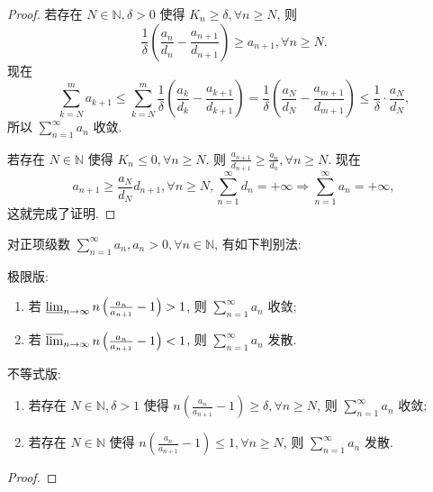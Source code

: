 \documentclass[../../main.tex]{subfiles}
\begin{document}
\begin{proof}
若存在 \( N \in \mathbb{N}, \delta > 0 \) 使得 \( K_n \geqslant \delta, \forall n \geqslant N \), 则
\[
\frac{1}{\delta} \left( \frac{a_n}{d_n} - \frac{a_{n + 1}}{d_{n + 1}} \right) \geqslant a_{n + 1}, \forall n \geqslant N.
\]
现在
\[
\sum_{k=N}^m a_{k + 1} \leqslant \sum_{k=N}^m \frac{1}{\delta} \left( \frac{a_k}{d_k} - \frac{a_{k + 1}}{d_{k + 1}} \right) = \frac{1}{\delta} \left( \frac{a_N}{d_N} - \frac{a_{m + 1}}{d_{m + 1}} \right) \leqslant \frac{1}{\delta} \cdot \frac{a_N}{d_N},
\]
所以 \( \sum_{n=1}^\infty a_n \) 收敛.

若存在 \( N \in \mathbb{N} \) 使得 \( K_n \leqslant 0, \forall n \geqslant N \). 则 \( \frac{a_{n + 1}}{d_{n + 1}} \geqslant \frac{a_n}{d_n}, \forall n \geqslant N \). 现在
\[
a_{n + 1} \geqslant \frac{a_N}{d_N} d_{n + 1}, \forall n \geqslant N, \sum_{n=1}^\infty d_n = +\infty \Rightarrow \sum_{n=1}^\infty a_n = +\infty,
\]
这就完成了证明.

\end{proof}

\begin{theorem}[拉比判别法]\label{theorem:拉比判别法}
对正项级数 \( \sum_{n=1}^\infty a_n, a_n > 0, \forall n \in \mathbb{N} \), 有如下判别法:

极限版:
\begin{enumerate}
\item 若 \( \varliminf_{n \to \infty} n \left( \frac{a_n}{a_{n + 1}} - 1 \right) > 1 \), 则 \( \sum_{n=1}^\infty a_n \) 收敛;
\item 若 \( \varlimsup_{n \to \infty} n \left( \frac{a_n}{a_{n + 1}} - 1 \right) < 1 \), 则 \( \sum_{n=1}^\infty a_n \) 发散.
\end{enumerate}

不等式版:
\begin{enumerate}
\item 若存在 \( N \in \mathbb{N}, \delta > 1 \) 使得 \( n \left( \frac{a_n}{a_{n + 1}} - 1 \right) \geqslant \delta, \forall n \geqslant N \), 则 \( \sum_{n=1}^\infty a_n \) 收敛;
\item 若存在 \( N \in \mathbb{N} \) 使得 \( n \left( \frac{a_n}{a_{n + 1}} - 1 \right) \leqslant 1, \forall n \geqslant N \), 则 \( \sum_{n=1}^\infty a_n \) 发散.
\end{enumerate}
\end{theorem}
\begin{proof}


\end{proof}
\end{document}
